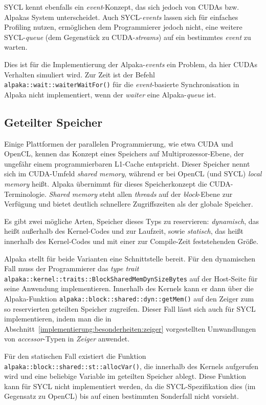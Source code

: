SYCL kennt ebenfalls ein \textit{event}-Konzept, das sich jedoch von CUDAs bzw.
Alpakas System unterscheidet. Auch SYCL-\textit{events} lassen sich für
einfaches Profiling nutzen, ermöglichen dem Programmierer jedoch nicht, eine
weitere SYCL-\textit{queue} (dem Gegenstück zu CUDA-\textit{streams}) auf ein
bestimmtes \textit{event} zu warten.

Dies ist für die Implementierung der Alpaka-\textit{events} ein Problem, da hier
CUDAs Verhalten simuliert wird. Zur Zeit ist der Befehl
\texttt{alpaka::wait::waiterWaitFor()} für die \textit{event}-basierte
Synchronisation in Alpaka nicht implementiert, wenn der \textit{waiter} eine
Alpaka-\textit{queue} ist.

\subsection{Geteilter Speicher}\label{implementierung:probleme:shared}

Einige Plattformen der parallelen Programmierung, wie etwa CUDA und OpenCL,
kennen das Konzept eines Speichers auf Multiprozessor-Ebene, der ungefähr
einem programmierbaren L1-Cache entspricht. Dieser Speicher nennt sich im
CUDA-Umfeld \textit{shared memory}, während er bei OpenCL (und SYCL)
\textit{local memory} heißt. Alpaka übernimmt für dieses Speicherkonzept die
CUDA-Terminologie. \textit{Shared memory} steht allen \textit{threads} auf
der \textit{block}-Ebene zur Verfügung und bietet deutlich schnellere
Zugriffszeiten als der globale Speicher.

Es gibt zwei mögliche Arten, Speicher dieses Typs zu reservieren:
\textit{dynamisch}, das heißt außerhalb des Kernel-Codes und zur Laufzeit, sowie
\textit{statisch}, das heißt innerhalb des Kernel-Codes und mit einer zur
Compile-Zeit feststehenden Größe.

Alpaka stellt für beide Varianten eine Schnittstelle bereit. Für den dynamischen
Fall muss der Programmierer das \textit{type trait}
\texttt{alpaka::kernel::traits::BlockSharedMemDynSizeBytes} auf der Host-Seite
für seine Anwendung implementieren. Innerhalb des Kernels kann er dann über die
Alpaka-Funktion \texttt{alpaka::block::shared::dyn::getMem()} auf den Zeiger
zum so reservierten geteilten Speicher zugreifen. Dieser Fall lässt sich auch
für SYCL implementieren, indem man die in
Abschnitt~\ref{implementierung:besonderheiten:zeiger} vorgestellten
Umwandlungen von \textit{accessor}-Typen in \textit{Zeiger} anwendet.

Für den statischen Fall existiert die Funktion
\texttt{alpaka::block::shared::st::allocVar()}, die innerhalb des Kernels
aufgerufen wird und eine beliebige Variable im geteilten Speicher ablegt. Diese
Funktion kann für SYCL nicht implementiert werden, da die SYCL-Spezifikation
dies (im Gegensatz zu OpenCL) bis auf einen bestimmten Sonderfall
\cite[siehe][Abschnitt 4.8.5.3]{sycl2019} nicht vorsieht.

